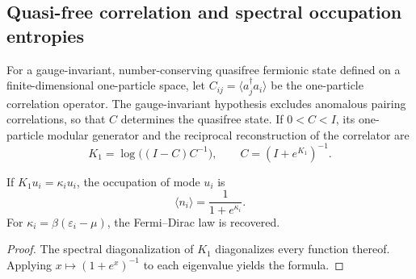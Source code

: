 \subsection{Quasi-free correlation and spectral occupation entropies}
\label{v:v:rec:cuasilibre:section:01}

For a gauge-invariant, number-conserving quasifree fermionic state
defined on a finite-dimensional one-particle space, let
\(C_{ij}=\langle a_j^\dagger a_i\rangle\) be the one-particle correlation
operator. The gauge-invariant hypothesis excludes anomalous pairing
correlations, so that \(C\) determines the quasifree state. If
\(0<C<I\), its one-particle modular generator and the reciprocal reconstruction
of the correlator are
\begin{equation}
 \boxed{
 K_1=\log\bigl((I-C)C^{-1}\bigr),
 \qquad
 C=(I+e^{K_1})^{-1}.}
 \label{v:v:rec:eq:puente-cuasilibre-modular-rev3}
\end{equation}

\begin{corollary}
\label{v:v:rec:cor:forma-logistica-modular-rev3}
If \(K_1u_i=\kappa_i u_i\), the occupation of mode \(u_i\) is
\[
 \langle n_i\rangle=\frac1{1+e^{\kappa_i}}.
\]
For \(\kappa_i=\beta(\varepsilon_i-\mu)\), the Fermi--Dirac law
is recovered.
\end{corollary}

\begin{proof}
The spectral diagonalization of \(K_1\) diagonalizes every function thereof. Applying
\(x\mapsto(1+e^x)^{-1}\) to each eigenvalue yields the formula.
\end{proof}

